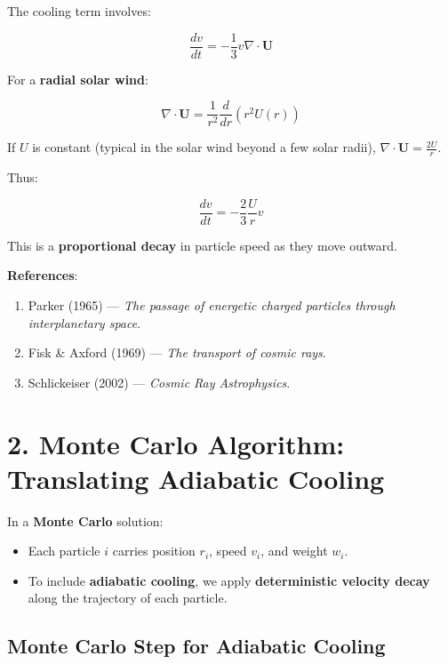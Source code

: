 The cooling term involves:

\begin{equation}
\boxed{
\frac{dv}{dt} = - \frac{1}{3} v \nabla \cdot \mathbf{U}
}
\tag{2}
\end{equation}

For a \textbf{radial solar wind}:

\begin{equation}
\nabla \cdot \mathbf{U} = \frac{1}{r^2} \frac{d}{dr}(r^2 U(r))
\tag{3}
\end{equation}

If $U$ is constant (typical in the solar wind beyond a few solar radii), $\nabla \cdot \mathbf{U} = \frac{2U}{r}$.

Thus:

\begin{equation}
\boxed{
\frac{dv}{dt} = -\frac{2}{3} \frac{U}{r} v
}
\tag{4}
\end{equation}

This is a \textbf{proportional decay} in particle speed as they move outward.

\medskip

\noindent
\textbf{ References}:
\begin{enumerate}
    \item Parker (1965) --- \textit{The passage of energetic charged particles through interplanetary space}.
    \item Fisk \& Axford (1969) --- \textit{The transport of cosmic rays}.
    \item Schlickeiser (2002) --- \textit{Cosmic Ray Astrophysics}.
\end{enumerate}

\hrulefill

\section*{\texorpdfstring{ \textbf{2. Monte Carlo Algorithm: Translating Adiabatic Cooling}}{}}

In a \textbf{Monte Carlo} solution:
\begin{itemize}
    \item Each particle $i$ carries position $r_i$, speed $v_i$, and weight $w_i$.
    \item To include \textbf{adiabatic cooling}, we apply \textbf{deterministic velocity decay} along the trajectory of each particle.
\end{itemize}

\subsection*{ Monte Carlo Step for Adiabatic Cooling}

